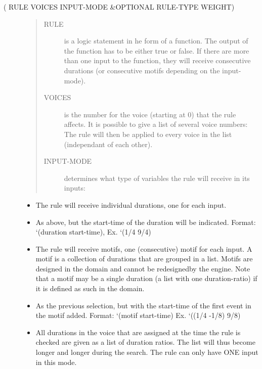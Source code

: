 \documentclass[letterpaper,10pt,english]{sphinxmanual}
\begin{document}
\begin{description}
\item[{ ( RULE VOICES INPUT-MODE \&OPTIONAL RULE-TYPE WEIGHT)}] \leavevmode\begin{quote}\begin{description}
\item[{RULE}] \leavevmode
is a logic statement in he form of a function. The output of the function has to be either true or false. If there are more than one input to the function, they will receive consecutive durations (or consecutive motifs depending on the input-mode).

\item[{VOICES}] \leavevmode
is the number for the voice (starting at 0) that the rule affects. It is possible to give a list of several voice numbers: The rule will then be applied to every voice in the list (independant of each other).

\item[{INPUT-MODE}] \leavevmode
determines what type of variables the rule will receive in its inputs:

\end{description}\end{quote}
\begin{itemize}
\item {} 
 The rule will receive individual durations, one for each input.

\item {} 
 As above, but the start-time of the duration will be indicated.
Format: ‘(duration start-time), Ex. ‘(1/4 9/4)

\item {} 
 The rule will receive motifs, one (consecutive) motif for each
input. A motif is a collection of durations that are grouped in
a list. Motifs are designed in the domain and cannot be
redesignedby the engine. Note that a motif may be a single
duration (a list with one duration-ratio) if it is defined as
such in the domain.

\item {} 
 As the previous selection, but with the start-time of the first event in the motif added. Format: ‘(motif start-time)
Ex. ‘((1/4 -1/8) 9/8)

\item {} 
 All durations in the voice that are assigned at the time the rule is checked are given as a list of duration ratios. The list will thus become longer and longer during the search. The rule can only have ONE input in this mode.


\end{itemize}
\end{description}
\end{document}

